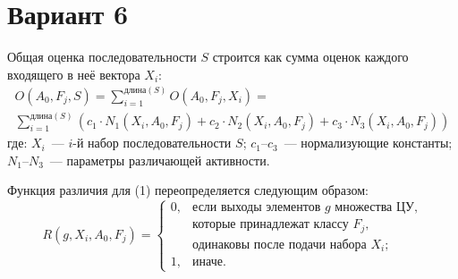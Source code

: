 \documentclass{article}
\begin{document}
\section*{Вариант 6}

Общая оценка последовательности $S$ строится как сумма оценок каждого
входящего в неё вектора $X_i$:
\begin{multline}
O(A_0, F_j, S) = \sum_{i=1}^{\textit{длина}(S)} O(A_0, F_j, X_i) = \\
\sum_{i=1}^{\textit{длина}(S)} (c_1 \cdot N_1(X_i, A_0, F_j) + c_2 \cdot N_2(X_i, A_0, F_j) + c_3 \cdot N_3(X_i, A_0, F_j))
\end{multline}
где: $X_i$~--- $i$-й набор последовательности $S$; $c_1$--$c_3$~--- нормализующие
константы; $N_1$--$N_3$~--- параметры различающей активности.

Функция различия для (1) переопределяется следующим образом:
\begin{equation}
R(g, X_i, A_0, F_j) =
\begin{cases}
0, & \text{если выходы элементов $g$ множества ЦУ,} \\
   & \text{которые принадлежат классу $F_j$,} \\
   & \text{одинаковы после подачи набора $X_i$;} \\
1, & \text{иначе.}
\end{cases}
\end{equation}
\end{document}
